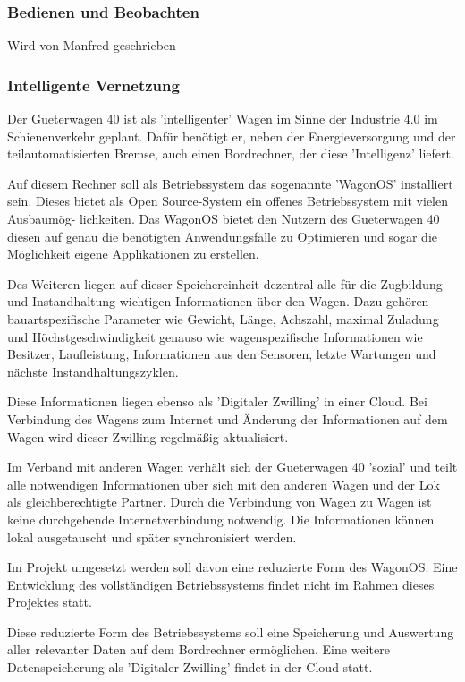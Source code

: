 \subsubsection{Bedienen und Beobachten}
Wird von Manfred geschrieben

\subsubsection{Intelligente Vernetzung}
Der \gls{Gueterwagen 40} ist als 'intelligenter' Wagen im Sinne der Industrie 4.0 im Schienenverkehr geplant. Dafür benötigt er, neben der Energieversorgung und der teilautomatisierten Bremse, auch einen Bordrechner, der diese 'Intelligenz' liefert.\par
Auf diesem Rechner soll als Betriebssystem das sogenannte '\gls{WagonOS}' installiert sein. Dieses bietet als Open Source-System ein offenes Betriebssystem mit vielen Ausbaumög- lichkeiten. Das \gls{WagonOS} bietet den Nutzern des \gls{Gueterwagen 40} diesen auf genau die benötigten Anwendungsfälle zu Optimieren und sogar die Möglichkeit eigene Applikationen zu erstellen.\par
Des Weiteren liegen auf dieser Speichereinheit dezentral alle für die Zugbildung und Instandhaltung wichtigen Informationen über den Wagen. Dazu gehören bauartspezifische Parameter wie Gewicht, Länge, Achszahl, maximal Zuladung und Höchstgeschwindigkeit genauso wie wagenspezifische Informationen wie Besitzer, Laufleistung, Informationen aus den Sensoren, letzte Wartungen und nächste Instandhaltungszyklen.\par
Diese Informationen liegen ebenso als 'Digitaler Zwilling' in einer Cloud. Bei Verbindung des Wagens zum Internet und Änderung der Informationen auf dem Wagen wird dieser Zwilling regelmäßig aktualisiert.\par
Im Verband mit anderen Wagen verhält sich der \gls{Gueterwagen 40} 'sozial' und teilt alle notwendigen Informationen über sich mit den anderen Wagen und der Lok als gleichberechtigte Partner. Durch die Verbindung von Wagen zu Wagen ist keine durchgehende Internetverbindung notwendig. Die Informationen können lokal ausgetauscht und später synchronisiert werden.\par
Im Projekt umgesetzt werden soll davon eine reduzierte Form des \gls{WagonOS}. Eine Entwicklung des vollständigen Betriebssystems findet nicht im Rahmen dieses Projektes statt.\par
Diese reduzierte Form des Betriebssystems soll eine Speicherung und Auswertung aller relevanter Daten auf dem Bordrechner ermöglichen. Eine weitere Datenspeicherung als 'Digitaler Zwilling' findet in der Cloud statt.



